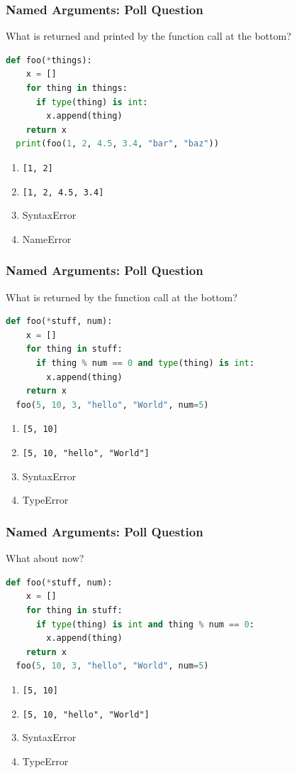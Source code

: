 \documentclass{beamer}
\begin{document}
%
%
\begin{frame}[fragile]
  \frametitle{Named Arguments: Poll Question}
  What is returned and printed by the function call at the bottom?
  \begin{lstlisting}[language=Python, autogobble]
  def foo(*things):
    x = []
    for thing in things:
      if type(thing) is int:
        x.append(thing)
    return x
  print(foo(1, 2, 4.5, 3.4, "bar", "baz"))    
  \end{lstlisting}
  \vfill
  \begin{enumerate}[A]
    \item \lstinline|[1, 2]|
    \item \lstinline|[1, 2, 4.5, 3.4]|
    \item SyntaxError
    \item NameError
  \end{enumerate}
\end{frame}


%
%
\begin{frame}[fragile]
  \frametitle{Named Arguments: Poll Question}
  What is returned by the function call at the bottom?
  \begin{lstlisting}[language=Python, autogobble]
  def foo(*stuff, num):
    x = []
    for thing in stuff:
      if thing % num == 0 and type(thing) is int:
        x.append(thing)
    return x
  foo(5, 10, 3, "hello", "World", num=5)
  \end{lstlisting}
  \vfill
  \begin{enumerate}[A]
    \item \lstinline|[5, 10]|
    \item \lstinline|[5, 10, "hello", "World"]|
    \item SyntaxError
    \item TypeError
  \end{enumerate}
\end{frame}

%
%
\begin{frame}[fragile]
  \frametitle{Named Arguments: Poll Question}
  What about now?
  \begin{lstlisting}[language=Python, autogobble]
  def foo(*stuff, num):
    x = []
    for thing in stuff:
      if type(thing) is int and thing % num == 0:
        x.append(thing)
    return x
  foo(5, 10, 3, "hello", "World", num=5)
  \end{lstlisting}
  \vfill
  \begin{enumerate}[A]
    \item \lstinline|[5, 10]|
    \item \lstinline|[5, 10, "hello", "World"]|
    \item SyntaxError
    \item TypeError
  \end{enumerate}
\end{frame}
\end{document}

